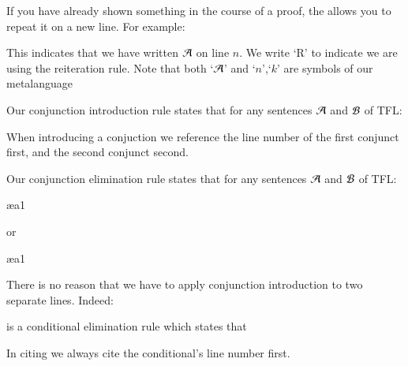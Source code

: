 \documentclass[12pt, a4paper, oneside, openright, titlepage]{book}
\begin{document}
\begin{defn}
    If you have already shown something in the course of a proof, the  allows you to repeat it on a new line. For example: 
    \begin{fitchproof}
        \have[$\vdots$]{}{\vdots}
         
    \end{fitchproof}
    This indicates that we have written $\mathcal{A}$ on line $n$. We write `R' to indicate we are using the reiteration rule. Note that both `$\mathcal{A}$' and `$n$',`$k$' are symbols of our metalanguage
\end{defn}


\begin{defn}
    Our conjunction introduction rule states that for any sentences $\mathcal{A}$ and $\mathcal{B}$ of TFL: \begin{fitchproof}
         
    \end{fitchproof}
    When introducing a conjuction we reference the line number of the first conjunct first, and the second conjunct second.
\end{defn}

\begin{defn}
    Our conjunction elimination rule states that for any sentences $\mathcal{A}$ and $\mathcal{B}$ of TFL: \begin{fitchproof}
         \ae{a1}
    \end{fitchproof}
    or \begin{fitchproof}
         \ae{a1}
    \end{fitchproof}
\end{defn}


\begin{rmk}
    There is no reason that we have to apply conjunction introduction to two separate lines. Indeed: \begin{fitchproof}
         
    \end{fitchproof}
\end{rmk}

\begin{defn}
     is a conditional elimination rule which states that \begin{fitchproof}
         
    \end{fitchproof}
    In citing we always cite the conditional's line number first.
\end{defn}
\end{document}
